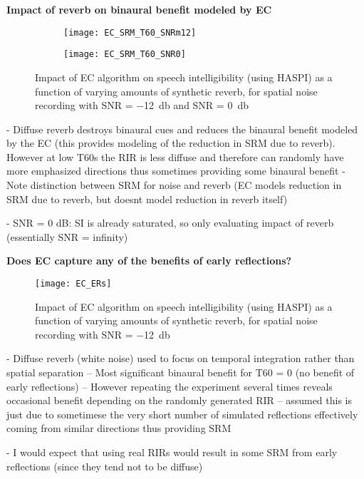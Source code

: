 \textbf{Impact of reverb on binaural benefit modeled by EC}


\begin{figure}[H]
	\centering
	\begin{subfigure}[b]{0.49\textwidth}
		\centering
		\texttt{[image: EC\_SRM\_T60\_SNRm12]}
	\end{subfigure}
	\hfill
	\begin{subfigure}[b]{0.49\textwidth}
		\centering
		\texttt{[image: EC\_SRM\_T60\_SNR0]}
	\end{subfigure}
	\caption{Impact of EC algorithm on speech intelligibility (using HASPI) as a function of varying amounts of synthetic reverb, for spatial noise recording with SNR = \qty{-12}{\decibel} and SNR = \qty{0}{\decibel}}
	\label{fig:EC_SRM_T60}
\end{figure}

- Diffuse reverb destroys binaural cues and reduces the binaural benefit modeled by the EC (this provides modeling of the reduction in SRM due to reverb). However at low T60s the RIR is less diffuse and therefore can randomly have more emphasized directions thus sometimes providing some binaural benefit
- Note distinction between SRM for noise and reverb (EC models reduction in SRM due to reverb, but doesnt model reduction in reverb itself)

- SNR = 0 dB: SI is already saturated, so only evaluating impact of reverb (essentially SNR = infinity)

\textbf{Does EC capture any of the benefits of early reflections?}


\begin{figure}[H]
	\texttt{[image: EC\_ERs]}
	\centering
	\caption{Impact of EC algorithm on speech intelligibility (using HASPI) as a function of varying amounts of synthetic reverb, for spatial noise recording with SNR = \qty{-12}{\decibel}  }
	\label{fig:EC_ReverbSNRBoost}
\end{figure}

- Diffuse reverb (white noise) used to focus on temporal integration rather than spatial separation -- Most significant binaural benefit for T60 = 0 (no benefit of early reflections) -- However repeating the experiment several times reveals occasional benefit depending on the randomly generated RIR -- assumed this is just due to sometimese the very short number of simulated reflections effectively coming from similar directions thus providing SRM

- I would expect that using real RIRs would result in some SRM from early reflections (since they tend not to be diffuse)

